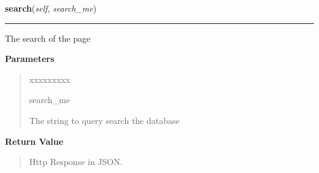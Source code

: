 \hspace{.8\funcindent}\begin{boxedminipage}{\funcwidth}

    \raggedright \textbf{search}(\textit{self}, \textit{search\_me})

    \vspace{-1.5ex}

    \rule{\textwidth}{0.5\fboxrule}
\setlength{\parskip}{2ex}
    The search of the page

\setlength{\parskip}{1ex}
      \textbf{Parameters}
      \vspace{-1ex}

      \begin{quote}
        \begin{Ventry}{xxxxxxxxx}

          \item[search\_me]

          The string to query search the database

        \end{Ventry}

      \end{quote}

      \textbf{Return Value}
    \vspace{-1ex}

      \begin{quote}
      Http Response in JSON.

      \end{quote}

    \end{boxedminipage}

